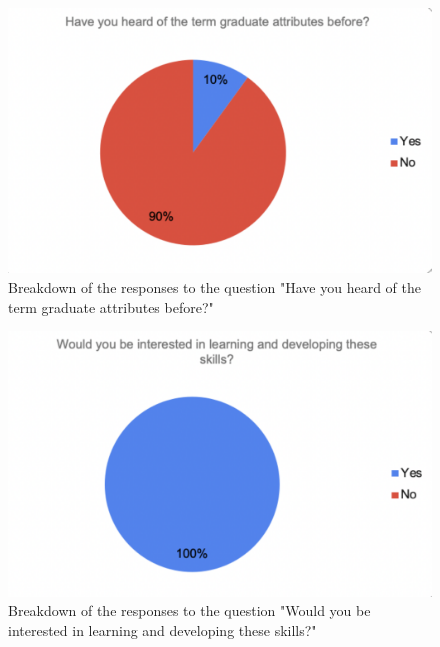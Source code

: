 \documentclass{l4proj}
\begin{document}
\begin{appendices}
\begin{figure}[H]
    \begin{centering}
    \includegraphics[scale=0.5]{images/GradAttr-1.pdf}
    \caption{Breakdown of the responses to the question "Have you heard of the term graduate attributes before?"}
    \label{fig: GradAttr-1}
    \end{centering}
\end{figure}

\begin{figure}[H]
    \begin{centering}
    \includegraphics[scale=0.5]{images/GradAttr-2.pdf}
    \caption{Breakdown of the responses to the question "Would you be interested in learning and developing these skills?"}
    \label{fig: GradAttr-2}
    \end{centering}
\end{figure}


\end{appendices}
\end{document}
